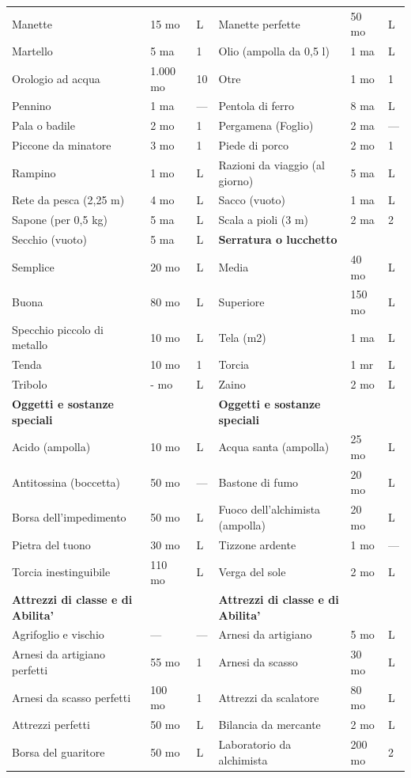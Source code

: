 \documentclass[a4paper,11pt,twoside,openany]{book}
\begin{document}
{\begin{longtable}{|L{4cm} |k{1.5cm} |k{1.5cm}|L{5cm} |k{1.5cm} |k{1.5cm}|}
			Manette&15 mo&L&	Manette perfette&50 mo&L\\
			Martello&5 ma&1&	Olio (ampolla da 0,5 l)&1 ma&L\\
			Orologio ad acqua&1.000 mo&10&	Otre&1 mo&1\\
			Pennino&1 ma&—&	Pentola di ferro&8 ma&L\\
			Pala o badile&2 mo&1&	Pergamena (Foglio)&2 ma&—\\
			Piccone da minatore&3 mo&1&	Piede di porco&2 mo&1\\
			Rampino&1 mo&L&	Razioni da viaggio (al giorno)&5 ma&L\\
			Rete da pesca (2,25 m)&4 mo&L&	Sacco (vuoto)&1 ma&L\\
			Sapone (per 0,5 kg)&5 ma&L&	Scala a pioli (3 m)&2 ma&2\\
			Secchio (vuoto)&5 ma&L&	\textbf{Serratura o lucchetto}&&\\
			Semplice&20 mo&L&	Media&40 mo&L\\
			Buona&80 mo&L&	Superiore&150 mo&L\\
			Specchio piccolo di metallo&10 mo&L&	Tela (m2)&1 ma&L\\
			Tenda&10 mo&1&	Torcia&1 mr&L\\
			Tribolo&- mo&L&	Zaino&2 mo&L\\
			\textbf{Oggetti e sostanze speciali}&&&	\textbf{Oggetti e sostanze speciali}&&\\
			Acido (ampolla)&10 mo&L&	Acqua santa (ampolla)&25 mo&L\\
			Antitossina (boccetta)&50 mo&—&	Bastone di fumo&20 mo&L\\
			Borsa dell’impedimento&50 mo&L&	Fuoco dell’alchimista (ampolla)&20 mo&L\\
			Pietra del tuono&30 mo&L&	Tizzone ardente&1 mo&—\\
			Torcia inestinguibile&110 mo&L&	Verga del sole&2 mo&L\\
			\textbf{Attrezzi di classe e di Abilita'}&&&\textbf{Attrezzi di classe e di Abilita'}&&\\
			Agrifoglio e vischio&—&—&	Arnesi da artigiano&5 mo&L\\
			Arnesi da artigiano perfetti&55 mo&1&	Arnesi da scasso&30 mo&L\\
			Arnesi da scasso perfetti&100 mo&1&	Attrezzi da scalatore&80 mo&L\\
			Attrezzi perfetti&50 mo&L&	Bilancia da mercante&2 mo&L\\
			Borsa del guaritore&50 mo&L&	Laboratorio da alchimista&200 mo&2\\

\end{longtable}}
\end{document}
